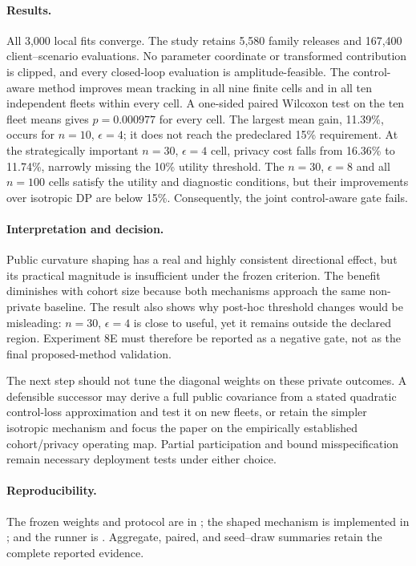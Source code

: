 \paragraph{Results.}
All 3,000 local fits converge. The study retains 5,580 family releases and
167,400 client--scenario evaluations. No parameter coordinate or transformed
contribution is clipped, and every closed-loop evaluation is amplitude-feasible.
The control-aware method improves mean tracking in all nine finite cells and in
all ten independent fleets within every cell. A one-sided paired Wilcoxon test
on the ten fleet means gives $p=0.000977$ for every cell. The largest mean gain,
11.39\%, occurs for $n=10$, $\epsilon=4$; it does not reach the predeclared
15\% requirement. At the strategically important $n=30$, $\epsilon=4$ cell,
privacy cost falls from 16.36\% to 11.74\%, narrowly missing the 10\% utility
threshold. The $n=30$, $\epsilon=8$ and all $n=100$ cells satisfy the utility and
diagnostic conditions, but their improvements over isotropic DP are below 15\%.
Consequently, the joint control-aware gate fails.

\paragraph{Interpretation and decision.}
Public curvature shaping has a real and highly consistent directional effect,
but its practical magnitude is insufficient under the frozen criterion. The
benefit diminishes with cohort size because both mechanisms approach the same
non-private baseline. The result also shows why post-hoc threshold changes would
be misleading: $n=30$, $\epsilon=4$ is close to useful, yet it remains outside
the declared region. Experiment 8E must therefore be reported as a negative gate,
not as the final proposed-method validation.

The next step should not tune the diagonal weights on these private outcomes.
A defensible successor may derive a full public covariance from a stated
quadratic control-loss approximation and test it on new fleets, or retain the
simpler isotropic mechanism and focus the paper on the empirically established
cohort/privacy operating map. Partial participation and bound misspecification
remain necessary deployment tests under either choice.

\paragraph{Reproducibility.}
The frozen weights and protocol are in
; the shaped mechanism is implemented in
; and the runner is
. Aggregate,
paired, and seed--draw summaries retain the complete reported evidence.
